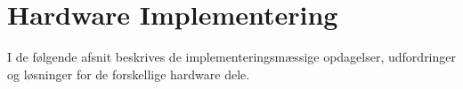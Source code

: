 \section{Hardware Implementering}

I de følgende afsnit beskrives de implementeringsmæssige opdagelser, udfordringer og løsninger for de forskellige hardware dele.



\clearpage